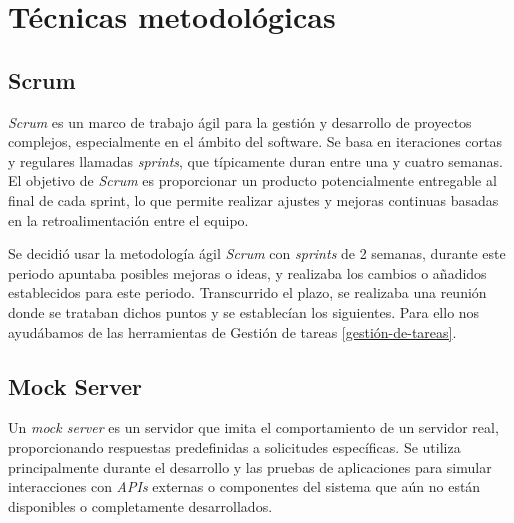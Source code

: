 
\begin{comment}
Esta parte de la memoria tiene como objetivo presentar las técnicas metodológicas y las herramientas de desarrollo que se han utilizado para llevar a cabo el proyecto. Si se han estudiado diferentes alternativas de metodologías, herramientas, bibliotecas se puede hacer un resumen de los aspectos más destacados de cada alternativa, incluyendo comparativas entre las distintas opciones y una justificación de las elecciones realizadas. 
No se pretende que este apartado se convierta en un capítulo de un libro dedicado a cada una de las alternativas, sino comentar los aspectos más destacados de cada opción, con un repaso somero a los fundamentos esenciales y referencias bibliográficas para que el lector pueda ampliar su conocimiento sobre el tema.
\end{comment}


\section{Técnicas metodológicas}

\subsection{Scrum}\label{scrum}

\textit{Scrum} es un marco de trabajo ágil para la gestión y desarrollo de proyectos complejos, especialmente en el ámbito del software. Se basa en iteraciones cortas y regulares llamadas \textit{sprints}, que típicamente duran entre una y cuatro semanas. El objetivo de \textit{Scrum} es proporcionar un producto potencialmente entregable al final de cada sprint, lo que permite realizar ajustes y mejoras continuas basadas en la retroalimentación entre el equipo. \cite{schwaber2020}

Se decidió usar la metodología ágil \textit{Scrum} con \textit{sprints} de 2 semanas, durante este periodo apuntaba posibles mejoras o ideas, y realizaba los cambios o añadidos establecidos para este periodo. Transcurrido el plazo, se realizaba una reunión donde se trataban dichos puntos y se establecían los siguientes. Para ello nos ayudábamos de las herramientas de Gestión de tareas \ref{gestión-de-tareas}.


\subsection{Mock Server}\label{mock-server}
Un \textit{mock server} es un servidor que imita el comportamiento de un servidor real, proporcionando respuestas predefinidas a solicitudes específicas. Se utiliza principalmente durante el desarrollo y las pruebas de aplicaciones para simular interacciones con \textit{APIs} externas o componentes del sistema que aún no están disponibles o completamente desarrollados.

